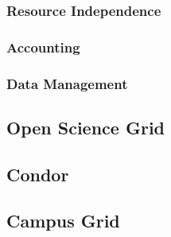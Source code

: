 \documentclass[11pt]{article}
\begin{document}
\subsubsection{Resource Independence}

\subsubsection{Accounting}

\subsubsection{Data Management}


\subsection{Open Science Grid}

\subsection{Condor}

\subsection{Campus Grid}








\end{document}
